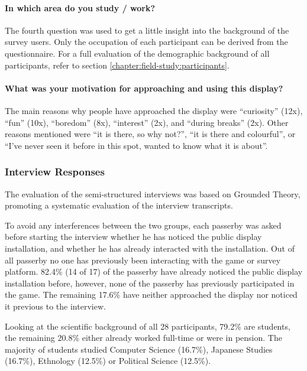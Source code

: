 	\paragraph{In which area do you study / work?}
	The fourth question was used to get a little insight into the background of the survey users. Only the occupation of each participant can be derived from the questionnaire. For a full evaluation of the demographic background of all participants, refer to section \ref{chapter:field-study:participants}.


	\paragraph{What was your motivation for approaching and using this display?}
	The main reasons why people have approached the display were ``curiosity'' (12x), ``fun'' (10x), ``boredom'' (8x), ``interest'' (2x), and ``during breaks'' (2x). Other reasons mentioned were ``it is there, so why not?'', ``it is there and colourful'', or ``I've never seen it before in this spot, wanted to know what it is about''.





	\subsubsection{Interview Responses}

	The evaluation of the semi-structured interviews was based on Grounded Theory, promoting a systematic evaluation of the interview transcripts.

	To avoid any interferences between the two groups, each passerby was asked before starting the interview whether he has noticed the public display installation, and whether he has already interacted with the installation. Out of all passerby no one has previously been interacting with the game or survey platform. 82.4\% (14 of 17) of the passerby have already noticed the public display installation before, however, none of the passerby has previously participated in the game. The remaining 17.6\% have neither approached the display nor noticed it previous to the interview. 

	Looking at the scientific background of all 28 participants, 79.2\% are students, the remaining 20.8\% either already worked full-time or were in pension. The majority of students studied Computer Science (16.7\%), Japanese Studies (16.7\%), Ethnology (12.5\%) or Political Science (12.5\%).

